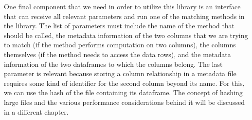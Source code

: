 One final component that we need in order to utilize this library is an interface that can receive all relevant parameters
and run one of the matching methods in the library.
The list of parameters must include the name of the method that should be called, the metadata information of the two columns
that we are trying to match (if the method performs computation on two columns), the columns themselves (if the method needs
to access the data rows), and the metadata information of the two dataframes to which the columns belong.
The last parameter is relevant because storing a column relationship in a metadata file requires some kind of identifier for
the second column beyond its name.
For this, we can use the hash of the file containing its dataframe.
The concept of hashing large files and the various performance considerations behind it will be discussed in a different chapter.
